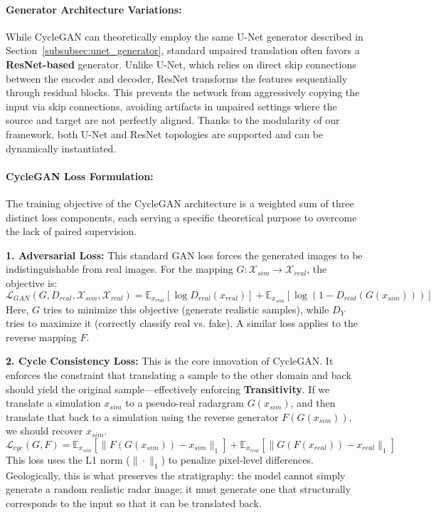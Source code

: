 \paragraph{Generator Architecture Variations:}
While CycleGAN can theoretically employ the same U-Net generator described in Section~\ref{subsubsec:unet_generator}, standard unpaired translation often favors a \textbf{ResNet-based} generator.
Unlike U-Net, which relies on direct skip connections between the encoder and decoder, ResNet transforms the features sequentially through residual blocks.
This prevents the network from aggressively copying the input via skip connections, avoiding artifacts in unpaired settings where the source and target are not perfectly aligned.
Thanks to the modularity of our framework, both U-Net and ResNet topologies are supported and can be dynamically instantiated.

\paragraph{CycleGAN Loss Formulation:}
The training objective of the CycleGAN architecture is a weighted sum of three distinct loss components, each serving a specific theoretical purpose to overcome the lack of paired supervision.

\textbf{1. Adversarial Loss:}
This standard GAN loss forces the generated images to be indistinguishable from real images.
For the mapping $G: \mathcal{X}_{sim} \rightarrow \mathcal{X}_{real}$, the objective is:
$$
\mathcal{L}_{GAN}(G, 
D_{real}, 
\mathcal{X}_{sim}, 
\mathcal{X}_{real})
=
\mathbb{E}_{x_{real}}
[\log D_{real}(x_{real})]
+
\mathbb{E}_{x_{sim}}
[\log(1 - D_{real}(G(x_{sim})))]
$$
Here, $G$ tries to minimize this objective (generate realistic samples), while $D_Y$ tries to maximize it (correctly classify real vs. fake).
A similar loss applies to the reverse mapping $F$.

\textbf{2. Cycle Consistency Loss:}
This is the core innovation of CycleGAN.
It enforces the constraint that translating a sample to the other domain and back should yield the original sample—effectively enforcing \textbf{Transitivity}.
If we translate a simulation $x_{sim}$ to a pseudo-real radargram $G(x_{sim})$, and then translate that back to a simulation using the reverse generator $F(G(x_{sim}))$, we should recover $x_{sim}$.
$$
\mathcal{L}_{cyc}(G, F)
=
\mathbb{E}_{x_{sim}}
\left[\|F(G(x_{sim})) - x_{sim}\|_1\right]
+
\mathbb{E}_{x_{real}}
\left[\|G(F(x_{real})) - x_{real}\|_1\right]
$$
This loss uses the L1 norm ($\|\cdot\|_1$) to penalize pixel-level differences.
Geologically, this is what preserves the stratigraphy: the model cannot simply generate a random realistic radar image; it must generate one that structurally corresponds to the input so that it can be translated back.

